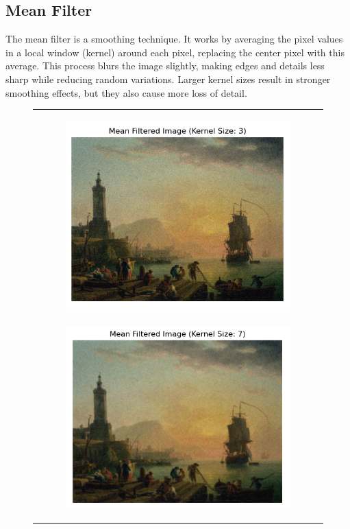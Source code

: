 \documentclass[hidelinks,12pt]{article}
\begin{document}
	\pagebreak
	\subsection{Mean Filter}
	The mean filter is a smoothing technique. It works by averaging the pixel values in a local window (kernel) around each pixel, replacing the center pixel with this average. This process blurs the image slightly, making edges and details less sharp while reducing random variations. Larger kernel sizes result in stronger smoothing effects, but they also cause more loss of detail.
	
	\begin{figure}[!h]
		\centering
		\begin{tabular}{c}
			\begin{subfigure}[h]{0.5\textwidth}
				\centering
				\includegraphics[width=\textwidth]{figures/mean_filter/k_3.png}
			\end{subfigure}
			\hfill
			\begin{subfigure}[h]{0.5\textwidth}
				\centering
				\includegraphics[width=\textwidth]{figures/mean_filter/k_7.png}
			\end{subfigure} \\
			

\end{tabular}
\end{figure}
\end{document}
